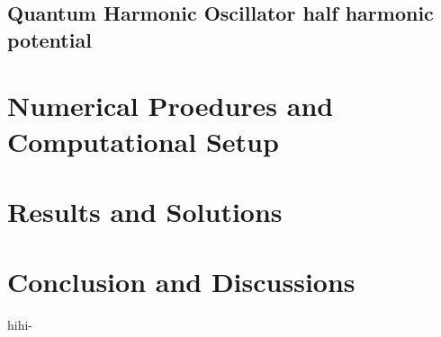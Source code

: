\documentclass{article}
\begin{document}
\begin{multicols}{2}
\subsection{\label{QHOHP}Quantum Harmonic Oscillator half harmonic potential}





\section{\label{expsetup}Numerical Proedures and Computational Setup}
\section{\label{observations}Results and Solutions}



\section{\label{Conclusion}Conclusion and Discussions}

hihi-\cite{ROOT}

\end{multicols}


\end{document}
